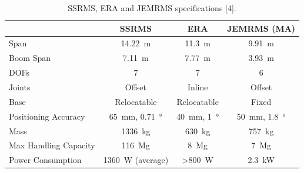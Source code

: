 \documentclass[a4paper,12pt,oneside]{report}
\begin{document}

  \begin{table}[h]
    \caption{SSRMS, ERA and JEMRMS specifications [4].}
    \label{SRMs_comparison}
    \begin{center}
    \begin{tabular}{lccc}
      \toprule
    & \textbf{SSRMS} & \textbf{ERA} & \textbf{JEMRMS (MA)}\\
    \midrule
    Span&\SI{14.22}{\metre}&\SI{11.3}{\metre}&\SI{9.91}{\metre}\\
    Boom Span&\SI{7.11}{\metre}&\SI{7.77}{\metre}&\SI{3.93}{\metre}\\
    DOFs&7&7&6\\
    Joints&Offset&Inline&Offset\\
    Base&Relocatable&Relocatable&Fixed\\
    Positioning Accuracy&\SI{65}{\milli\metre}, \SI{0.71}{\degree}&\SI{40}{\milli\metre}, \SI{1}{\degree}&\SI{50}{\milli\metre}, \SI{1.8}{\degree}\\
    Mass&\SI{1336}{\kilogram}&\SI{630}{\kilogram}&\SI{757}{\kilogram}\\
    Max Handling Capacity&\SI{116}{\mega\gram}&\SI{8}{\mega\gram}&\SI{7}{\mega\gram}\\
    Power Consumption&\SI{1360}{\watt} (average)&>\SI{800}{\watt}&\SI{2.3}{\kilo\watt}\\
    \bottomrule
    \end{tabular}
    \end{center}
    \end{table}
\end{document}
